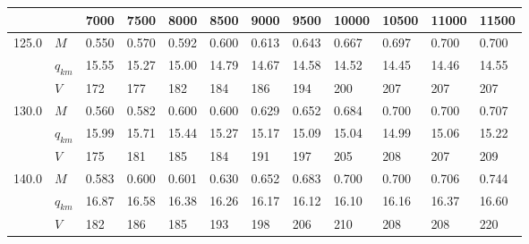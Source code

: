 \documentclass{article}
\begin{document}
\begin{tabular}{llllllllllll}
\toprule
      &     &    7000 &                     7500 &                     8000 &                     8500 &                     9000 &                     9500 &                    10000 &                    10500 &   11000 &   11500 \\
\midrule
125.0 & $M$ &  0.550  &                   0.570  &                   0.592  &                   0.600  &                   0.613  &                   0.643  &                   0.667  &  0.697 \cellcolor{green} &  0.700  &  0.700  \\
      & $q_{km}$ &  15.55  &                   15.27  &                   15.00  &                   14.79  &                   14.67  &                   14.58  &                   14.52  &  14.45 \cellcolor{green} &  14.46  &  14.55  \\
      & $V$ &    172  &                     177  &                     182  &                     184  &                     186  &                     194  &                     200  &    207 \cellcolor{green} &    207  &    207  \\
130.0 & $M$ &  0.560  &                   0.582  &                   0.600  &                   0.600  &                   0.629  &                   0.652  &                   0.684  &  0.700 \cellcolor{green} &  0.700  &  0.707  \\
      & $q_{km}$ &  15.99  &                   15.71  &                   15.44  &                   15.27  &                   15.17  &                   15.09  &                   15.04  &  14.99 \cellcolor{green} &  15.06  &  15.22  \\
      & $V$ &    175  &                     181  &                     185  &                     184  &                     191  &                     197  &                     205  &    208 \cellcolor{green} &    207  &    209  \\
140.0 & $M$ &  0.583  &                   0.600  &                   0.601  &                   0.630  &                   0.652  &                   0.683  &  0.700 \cellcolor{green} &                   0.700  &  0.706  &  0.744  \\
      & $q_{km}$ &  16.87  &                   16.58  &                   16.38  &                   16.26  &                   16.17  &                   16.12  &  16.10 \cellcolor{green} &                   16.16  &  16.37  &  16.60  \\
      & $V$ &    182  &                     186  &                     185  &                     193  &                     198  &                     206  &    210 \cellcolor{green} &                     208  &    208  &    220  \\

\end{tabular}
\end{document}
